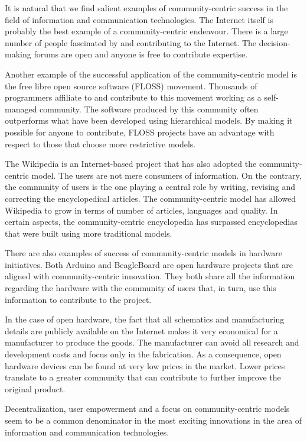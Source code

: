 \documentclass[journal]{IEEEtran}
\begin{document}
It is natural that we find salient examples of community-centric success in the field of information and communication technologies.
The Internet itself is probably the best example of a community-centric endeavour.
There is a large number of people fascinated by and contributing to the Internet.
The decision-making forums are open and anyone is free to contribute expertise.

Another example of the successful application of the community-centric model is the free libre open source software (FLOSS) movement.
Thousands of programmers affiliate to and contribute to this movement working as a self-managed community.
The software produced by this community often outperforms what have been developed using hierarchical models.
By making it possible for anyone to contribute, FLOSS projects have an advantage with respect to those that choose more restrictive models.

The Wikipedia is an Internet-based project that has also adopted the community-centric model.
The users are not mere consumers of information. 
On the contrary, the community of users is the one playing a central role by writing, revising and correcting the encyclopedical articles.
The community-centric model has allowed Wikipedia to grow in terms of number of articles, languages and quality.
In certain aspects, the community-centric encyclopedia has surpassed encyclopedias that were built using more traditional models.

There are also examples of success of community-centric models in hardware initiatives.
Both Arduino and BeagleBoard are open hardware projects that are aligned with community-centric innovation.
They both share all the information regarding the hardware with the community of users that, in turn, use this information to contribute to the project.

In the case of open hardware, the fact that all schematics and manufacturing details are publicly available on the Internet makes it very economical for a manufacturer to produce the goods.
The manufacturer can avoid all research and development costs and focus only in the fabrication.
As a consequence, open hardware devices can be found at very low prices in the market.
Lower prices translate to a greater community that can contribute to further improve the original product.

Decentralization, user empowerment and a focus on community-centric models seem to be a common denominator in the most exciting innovations in the area of information and communication technologies.
\end{document}
